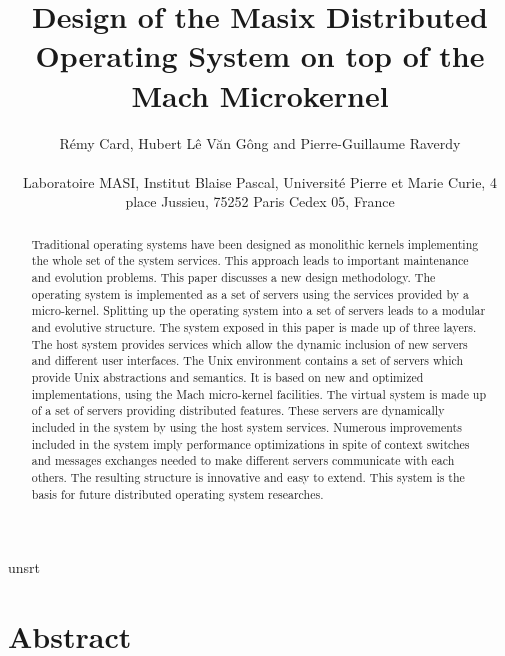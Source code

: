%
%


\title {Design of the Masix Distributed Operating System on top of the Mach
Microkernel}

\author {R\'emy Card, Hubert L\^e V\u an G\^ong and Pierre-Guillaume Raverdy \\
	~\\
	Laboratoire MASI, Institut Blaise Pascal, Universit\'e Pierre et Marie Curie, 4 place Jussieu, 75252 Paris Cedex 05, France}

%
%


	 {unsrt}

\maketitle

\section* {Abstract}
\begin {abstract}
\vspace {-12pt}
	Traditional operating systems have been designed as monolithic
kernels implementing the whole set of the system services. This approach leads
to important maintenance and evolution problems. This paper discusses a new
design methodology. The operating system is implemented as a set of servers
using the services provided by a micro-kernel. Splitting up the operating
system into a set of servers leads to a modular and evolutive structure. The
system exposed in this paper is made up of three layers. The 
host system provides services which allow the dynamic inclusion of new servers
and different user interfaces. The Unix environment contains
a set of servers which provide Unix abstractions and semantics. It is based
on new and optimized implementations, using the Mach micro-kernel facilities.
The virtual system is made up of a set of servers providing
distributed features. These servers are dynamically included in the system by
using the host system services. Numerous improvements included in the system
imply performance optimizations in spite of context switches and messages
exchanges needed to make different servers communicate with each others. The
resulting structure is innovative and easy to extend. This system is the basis
for future distributed operating system researches.
\end {abstract}

